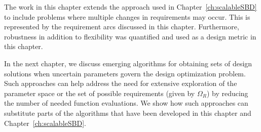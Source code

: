 The work in this chapter extends the approach used in Chapter~\ref{ch:scalableSBD} to include problems where multiple changes in requirements may occur. This is represented by the requirement arcs discussed in this chapter. Furthermore, robustness in addition to flexibility was quantified and used as a design metric in this chapter.

In the next chapter, we discuss emerging algorithms for obtaining sets of design solutions when uncertain parameters govern the design optimization problem. Such approaches can help address the need for extensive exploration of the parameter space or the set of possible requirements (given by $\Omega_R$) by reducing the number of needed function evaluations. We show how such approaches can substitute parts of the algorithms that have been developed in this chapter and Chapter~\ref{ch:scalableSBD}.